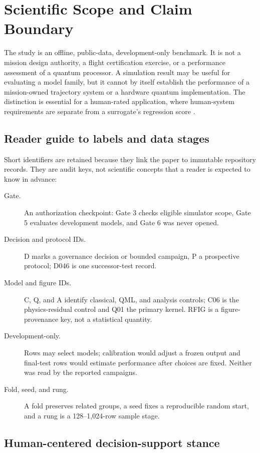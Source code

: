\section{Scientific Scope and Claim Boundary}
\label{sec:scope}

The study is an offline, public-data, development-only benchmark. It is not a
mission design authority, a flight certification exercise, or a performance
assessment of a quantum processor. A simulation result may be useful for
evaluating a model family, but it cannot by itself establish the performance
of a mission-owned trajectory system or a hardware quantum implementation.
The distinction is essential for a human-rated application, where human-system
requirements are separate from a surrogate's regression score
\cite{nasa3001}.

\subsection{Reader guide to labels and data stages}

Short identifiers are retained because they link the paper to immutable
repository records. They are audit keys, not scientific concepts that a reader
is expected to know in advance:
\begin{description}
\item[Gate.] An authorization checkpoint: Gate 3 checks eligible simulator
scope, Gate 5 evaluates development models, and Gate 6 was never opened.
\item[Decision and protocol IDs.] D marks a governance decision or bounded
campaign, P a prospective protocol; D046 is one successor-test record.
\item[Model and figure IDs.] C, Q, and A identify classical, QML, and analysis
controls; C06 is the physics-residual control and Q01 the primary kernel.
RFIG is a figure-provenance key, not a statistical quantity.
\item[Development-only.] Rows may select models; calibration would adjust a
frozen output and final-test rows would estimate performance after choices are
fixed. Neither was read by the reported campaigns.
\item[Fold, seed, and rung.] A fold preserves related groups, a seed fixes a
reproducible random start, and a rung is a 128--1,024-row sample stage.
\end{description}

\subsection{Human-centered decision-support stance}

